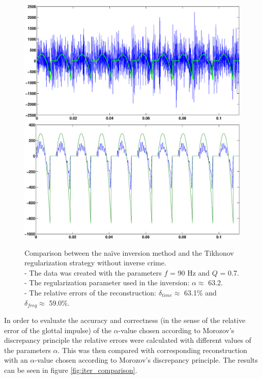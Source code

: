 \documentclass[12pt,a4]{article}
\newcommand{\inversionresult}[5]{\\
 - The data was created with the parameters $f$ = #1 Hz and $Q$ = #2.\\
 - The regularization parameter used in the inversion: $\alpha \approx$ #3.\\
 - The relative errors of the reconstruction: $\delta_{time} \approx$ #4\% and $\delta_{freq} \approx$ #5\%.}
\begin{document}
\begin{figure}[H]
\begin{center}
\includegraphics[scale=.3]{img/naive_test_naive[V3].eps}
\includegraphics[scale=.3]{img/naive_test_morozov[V3].eps}
\end{center}
\caption{Comparison between the naïve inversion method and the Tikhonov regularization strategy without inverse crime. \inversionresult{90}{0.7}{63.2}{63.1}{59.0}}
\label{fig:naive-comparison_nocrime}
\end{figure}
In order to evaluate the accuracy and correctness (in the sense of the relative error of the glottal impulse) of the $\alpha$-value chosen according to Morozov's discrepancy principle the relative errors were calculated with different values of the parameters $\alpha$. This was then compared with corresponding reconstruction with an $\alpha$-value chosen according to Morozov's discrepancy principle. The results can be seen in figure \ref{fig:iter_comparison}.
\end{document}

